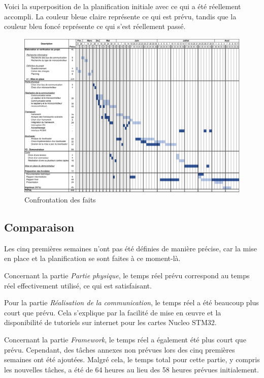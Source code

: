 Voici la superposition de la planification initiale avec ce qui a été réellement accompli. La couleur bleue claire représente ce qui est prévu, tandis que la couleur bleu foncé représente ce qui s'est réellement passé.

\begin{figure}[H]
    \centering
    \includegraphics[angle=90,origin=c,scale=0.54]{./assets/files/planning_reel.pdf}
    \caption{Confrontation des faits}
\end{figure}

\newpage
\subsection{Comparaison}

Les cinq premières semaines n'ont pas été définies de manière précise, car la mise en place et la planification se sont faites à ce moment-là.

Concernant la partie \textit{Partie physique}, le temps réel prévu correspond au temps réel effectivement utilisé, ce qui est satisfaisant.

Pour la partie \textit{Réalisation de la communication}, le temps réel a été beaucoup plus court que prévu.
Cela s'explique par la facilité de mise en œuvre et la disponibilité de tutoriels sur internet pour les cartes Nucleo STM32.

Concernant la partie \textit{Framework}, le temps réel a également été plus court que prévu.
Cependant, des tâches annexes non prévues lors des cinq premières semaines ont été ajoutées.
Malgré cela, le temps total pour cette partie, y compris les nouvelles tâches, a été de 64 heures au lieu des 58 heures prévues initialement.

